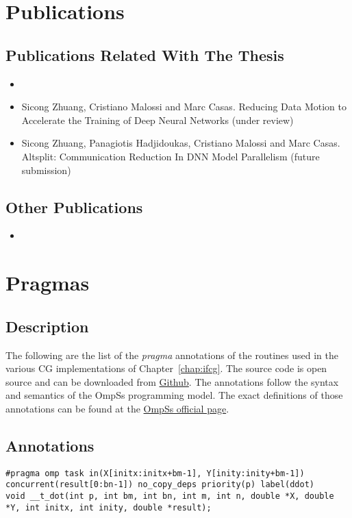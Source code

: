\begin{appendices}
\chapter{Publications}
\section{Publications Related With The Thesis}
\begin{itemize}
	\item {}
	\item Sicong Zhuang, Cristiano Malossi and Marc Casas. Reducing Data Motion 
        to Accelerate the Training of Deep Neural Networks (under review)
	\item Sicong Zhuang, Panagiotis Hadjidoukas, Cristiano Malossi and Marc 
        Casas. Altsplit: Communication Reduction In DNN Model Parallelism 
        (future submission)
\end{itemize}

\section{Other Publications}
\begin{itemize}
    \item {}
\end{itemize}

\chapter{Pragmas}
\section{Description}
The following are the list of the \textit{pragma} annotations of the routines 
used in the various CG implementations of Chapter~\ref{chap:ifcg}. The 
source code is open source and can be downloaded from
\href{git@github.com:zhuangsc/IFCG.git}{Github}. The annotations follow the 
syntax and semantics of the OmpSs programming model. The exact definitions 
of those annotations can be found at the
\href{https://pm.bsc.es/ftp/ompss/doc/spec/}{OmpSs official page}.

\section{Annotations}
\begin{lstlisting}
#pragma omp task in(X[initx:initx+bm-1], Y[inity:inity+bm-1]) concurrent(result[0:bn-1]) no_copy_deps priority(p) label(ddot) 
void __t_dot(int p, int bm, int bn, int m, int n, double *X, double *Y, int initx, int inity, double *result); 


\end{lstlisting}
\end{appendices}
